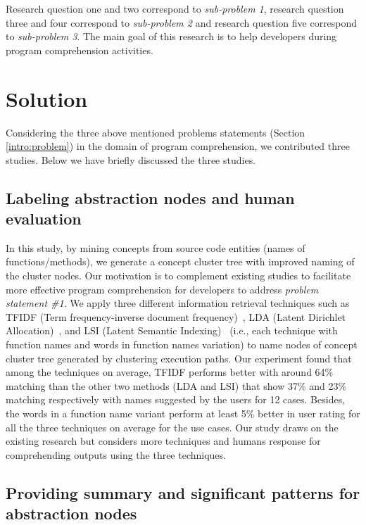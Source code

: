 Research question one and two correspond to \emph{sub-problem 1}, research question three and four correspond to \emph{sub-problem 2} and research question five correspond to \emph{sub-problem 3}. The main goal of this research is to help developers during program comprehension activities. 



\section{Solution}
\label{intro:solution}
Considering the three above mentioned problems statements (Section \ref{intro:problem}) in the domain of program comprehension, we contributed three studies. Below we have briefly discussed the three studies.  

\subsection{Labeling abstraction nodes and human evaluation}

In this study, by mining concepts from source code entities (names of functions/methods), we generate a concept cluster tree
with improved naming of the cluster nodes. Our motivation is to complement existing studies to facilitate more effective program comprehension for
developers to address \emph{problem statement \#1}. We apply three different information retrieval techniques such as TFIDF (Term frequency-inverse document frequency)~\cite{ramos2003usingTfidfRelevance}, LDA (Latent  Dirichlet  Allocation)~\cite{blei2003latentLDA}, and LSI (Latent Semantic Indexing)~\cite{deerwester1990indexingLSI} (i.e., each technique with function
names and words in function names variation) to name nodes of concept cluster tree generated by clustering execution paths. Our experiment found that among the techniques on average, TFIDF performs better with around 64\% matching than the other
two methods (LDA and LSI) that show 37\% and 23\% matching respectively with names suggested by the users for 12 cases. Besides,
the words in a function name variant perform at least 5\% better in user rating for all the three techniques on average for the use cases.
Our study draws on the existing research but considers more techniques and humans response for comprehending outputs using the three
techniques.

\subsection{Providing summary and significant patterns for abstraction nodes}

